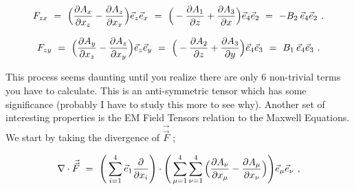 \documentclass{article}
\begin{document}
\begin{equation} \label{eq:1002}
F_{z x} \hspace{0.125cm} = \hspace{0.125cm}  \Big( \frac{\partial{A_{x}}}{\partial{x_{z}}} - \frac{\partial{A_{z}}}{\partial{x_{x}}} \Big) \vec{e}_{z} \vec{e}_{x} \hspace{0.125cm} = \hspace{0.125cm} \Big( - \frac{\partial{A_{1}}}{\partial{z}} + \frac{\partial{A_{3}}}{\partial{x}} \Big) \vec{e}_{4} \vec{e}_{2} \hspace{0.125cm} = \hspace{0.125cm} - B_2 \hspace{0.075cm} \vec{e}_{4} \vec{e}_{2} \hspace{0.125cm} .
\end{equation}

\begin{equation} \label{eq:1002}
F_{z y} \hspace{0.125cm} = \hspace{0.125cm}  \Big( \frac{\partial{A_{y}}}{\partial{x_{z}}} - \frac{\partial{A_{z}}}{\partial{x_{y}}} \Big) \vec{e}_{z} \vec{e}_{y} \hspace{0.125cm} = \hspace{0.125cm} \Big( - \frac{\partial{A_{2}}}{\partial{z}} + \frac{\partial{A_{3}}}{\partial{y}} \Big) \vec{e}_{4} \vec{e}_{3} \hspace{0.125cm} = \hspace{0.125cm} B_1 \hspace{0.075cm} \vec{e}_{4} \vec{e}_{3} \hspace{0.125cm} .
\end{equation}

This process seems daunting until you realize there are only 6 non-trivial terms you have to calculate. This is an anti-symmetric tensor which has some significance (probably I have to study this more to see why). Another set of interesting properties is the EM Field Tensors relation to the Maxwell Equations. We start by taking the divergence of \begin{math} \vec{\vec{F}} \end{math} ;

\begin{equation} \label{eq:1002}
\nabla \cdot \vec{\vec{F}} \hspace{0.125cm} = \hspace{0.125cm}  \Bigg( \sum_{i = 1}^{4} \vec{e}_1 \frac{\partial}{\partial{x_i}} \Bigg) \cdot \Bigg( \sum_{\mu = 1}^{4} \sum_{\nu = 1}^{4} \Big( \frac{\partial{A_{\nu}}}{\partial{x_{\mu}}} - \frac{\partial{A_{\mu}}}{\partial{x_{\nu}}} \Big) \Bigg)  \vec{e}_{\mu} \vec{e}_{\nu} \hspace{0.125cm} ,
\end{equation}
\end{document}
